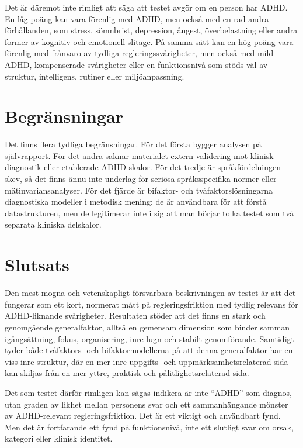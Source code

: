 \documentclass[11pt,a4paper]{article}
\begin{document}
Det är däremot inte rimligt att säga att testet avgör om en person har ADHD. En låg poäng kan vara förenlig med ADHD, men också med en rad andra förhållanden, som stress, sömnbrist, depression, ångest, överbelastning eller andra former av kognitiv och emotionell slitage. På samma sätt kan en hög poäng vara förenlig med frånvaro av tydliga regleringssvårigheter, men också med mild ADHD, kompenserade svårigheter eller en funktionsnivå som stöds väl av struktur, intelligens, rutiner eller miljöanpassning.

\section{Begränsningar}
Det finns flera tydliga begränsningar. För det första bygger analysen på självrapport. För det andra saknar materialet extern validering mot klinisk diagnostik eller etablerade ADHD-skalor. För det tredje är språkfördelningen skev, så det finns ännu inte underlag för seriösa språksspecifika normer eller mätinvariansanalyser. För det fjärde är bifaktor- och tvåfaktorslösningarna diagnostiska modeller i metodisk mening; de är användbara för att förstå datastrukturen, men de legitimerar inte i sig att man börjar tolka testet som två separata kliniska delskalor.

\section{Slutsats}
Den mest mogna och vetenskapligt försvarbara beskrivningen av testet är att det fungerar som ett kort, normerat mått på regleringsfriktion med tydlig relevans för ADHD-liknande svårigheter. Resultaten stöder att det finns en stark och genomgående generalfaktor, alltså en gemensam dimension som binder samman igångsättning, fokus, organisering, inre lugn och stabilt genomförande. Samtidigt tyder både tvåfaktors- och bifaktormodellerna på att denna generalfaktor har en viss inre struktur, där en mer inre uppgifts- och uppmärksamhetsrelaterad sida kan skiljas från en mer yttre, praktisk och pålitlighetsrelaterad sida.

Det som testet därför rimligen kan sägas indikera är inte ``ADHD'' som diagnos, utan graden av likhet mellan personens svar och ett sammanhängande mönster av ADHD-relevant regleringsfriktion. Det är ett viktigt och användbart fynd. Men det är fortfarande ett fynd på funktionsnivå, inte ett slutligt svar om orsak, kategori eller klinisk identitet.

\printbibliography
\end{document}
